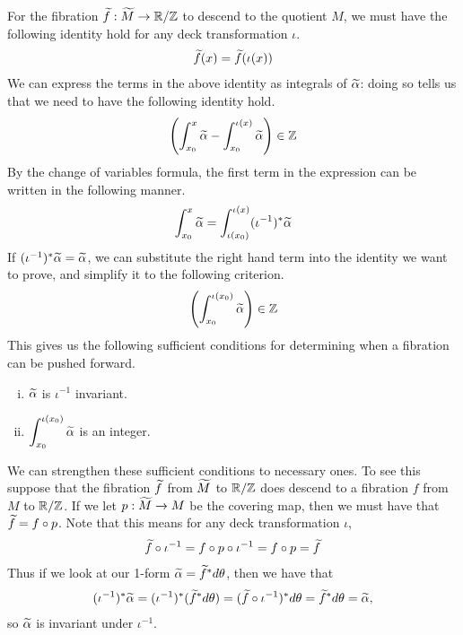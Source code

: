 For the fibration $\widetilde{f}: \widetilde{M} \to \mathbb{R}/\mathbb{Z}$ to descend to the quotient $M$, we must have the
following identity hold for any deck transformation $\iota$.
\begin{align*}
  \widetilde{f}(x) = \widetilde{f}(\iota(x))
\end{align*}
We can express the terms in the above identity as integrals of $\widetilde{\alpha}$: doing so tells us that
we need to have the following identity hold.
\begin{align*}
  \left(   \int_{x_0}^x \widetilde{\alpha} - \int_{x_0}^{\iota(x)} \widetilde{\alpha}\right) \in \mathbb{Z}
\end{align*}
By the change of variables formula, the first term in the expression can be written in the
following manner.
\begin{align*}
  \int_{x_0}^x \widetilde{\alpha} = \int_{\iota(x_0)}^{\iota(x)} (\iota^{-1})^{\ast} \widetilde{\alpha}
\end{align*}
If $( \iota^{-1})^{\ast}\widetilde{\alpha} = \widetilde{\alpha}$, we can substitute the right hand term into the identity we want
to prove, and simplify it to the following criterion.
\begin{align*}
  \left(   \int_{x_0}^{\iota(x_0)} \widetilde{\alpha}\right) \in \mathbb{Z}
\end{align*}
This gives us the following sufficient conditions for determining when a fibration can be pushed forward.

\begin{enumerate}[(i)]
    \item $\widetilde{\alpha}$ is $\iota^{-1}$ invariant.
    \item $\displaystyle \int_{x_0}^{\iota(x_0)} \widetilde{\alpha}$ is an integer.
\end{enumerate}

We can strengthen these sufficient conditions to necessary ones. To see this suppose that the fibration $\widetilde{f}$ from $\widetilde{M}$ to $\mathbb{R}/\mathbb{Z}$ does descend to a fibration $f$ from $M$ to $\mathbb{R}/\mathbb{Z}$. If we let $p: \widetilde{M} \xrightarrow[]{} M$ be the covering map, then we must have that $\widetilde{f} = f \circ p$. Note that this means for any deck transformation $\iota$, 
\begin{align*}
    \widetilde{f} \circ \iota^{-1} = f \circ p \circ \iota^{-1} = f \circ p = \widetilde{f}
\end{align*}
Thus if we look at our 1-form $\widetilde{\alpha} = \widetilde{f}^*d\theta$, then we have that
\begin{align*}
    (\iota^{-1})^*\widetilde{\alpha} = (\iota^{-1})^*(\widetilde{f}^*d\theta) = (\widetilde{f} \circ \iota^{-1})^*d\theta = \widetilde{f}^*d\theta = \widetilde{\alpha}, 
\end{align*}
so $\widetilde{\alpha}$ is invariant under $\iota^{-1}$.


